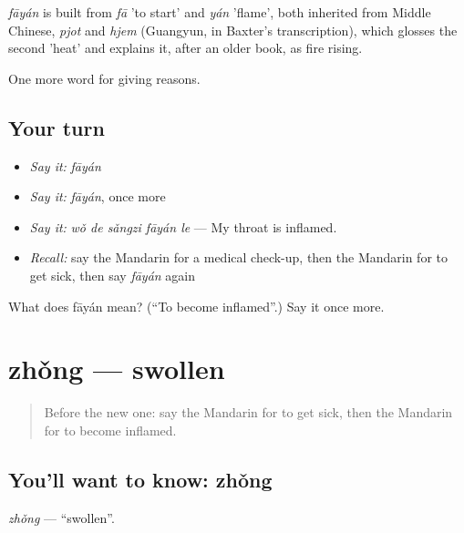 \begin{cousinweb}
\emph{fāyán} is built from \emph{fā} 'to start' and \emph{yán} 'flame', both inherited from Middle Chinese, \emph{pjot} and \emph{hjem} (Guangyun, in Baxter's transcription), which glosses the second 'heat' and explains it, after an older book, as fire rising.
\end{cousinweb}

\begin{grammarlens}[title={What you've built}]
One more word for giving reasons.
\end{grammarlens}

\subsection*{Your turn}
\begin{itemize}
\raggedright
  \item \emph{Say it:} \emph{fāyán}
  \item \emph{Say it:} \emph{fāyán}, once more
  \item \emph{Say it:} \emph{wǒ de sǎngzi fāyán le} — My throat is inflamed.
  \item \emph{Recall:} say the Mandarin for a medical check-up, then the Mandarin for to get sick, then say \emph{fāyán} again
\end{itemize}

\begin{tcolorbox}[breakable,colback=teal!4,colframe=teal!35!black,title={Before you move on}]
What does fāyán mean? (\textquotedblleft{}To become inflamed\textquotedblright{}.) Say it once more.
\end{tcolorbox}
\section[zhǒng]{zhǒng — swollen}

\label{lesson:ZH-C240-zhong}



\begin{quote}
Before the new one: say the Mandarin for to get sick, then the Mandarin for to become inflamed.
\end{quote}

\subsection*{You'll want to know: zhǒng}
\emph{zhǒng} — \textquotedblleft{}swollen\textquotedblright{}.

